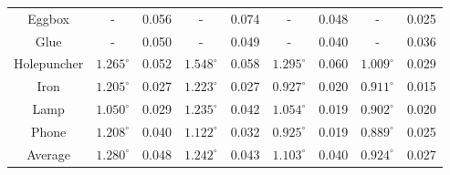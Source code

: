 \documentclass[10pt,twocolumn,letterpaper]{article}
\begin{document}
\begin{table*}
\begin{tabular}{c||cc|cc|cc|cc}
  Eggbox     & -                & 0.056 & -               & 0.074 & -               & 0.048 & -               & 0.025 \\
  Glue       & -                & 0.050 & -               & 0.049 & -               & 0.040 & -               & 0.036 \\
  Holepuncher& $1.265^{\circ} $ & 0.052 & $1.548^{\circ}$ & 0.058 & $1.295^{\circ}$ & 0.060 & $1.009^{\circ}$ & 0.029 \\
  Iron       & $1.205^{\circ} $ & 0.027 & $1.223^{\circ}$ & 0.027 & $0.927^{\circ}$ & 0.020 & $0.911^{\circ}$ & 0.015 \\ 
  Lamp       & $1.050^{\circ} $ & 0.029 & $1.235^{\circ}$ & 0.042 & $1.054^{\circ}$ & 0.019 & $0.902^{\circ}$ & 0.020 \\ 
  Phone      & $1.208^{\circ} $ & 0.040 & $1.122^{\circ}$ & 0.032 & $0.925^{\circ}$ & 0.019 & $0.889^{\circ}$ & 0.025 \\ \hline
  Average    & $1.280^{\circ} $ & 0.048 & $1.242^{\circ}$ & 0.043 & $1.103^{\circ}$ & 0.040 & $0.924^{\circ}$ & 0.027 \\ \hline
\end{tabular}
\label{tab:rot_trans_ablation}
\end{table*}
\end{document}
